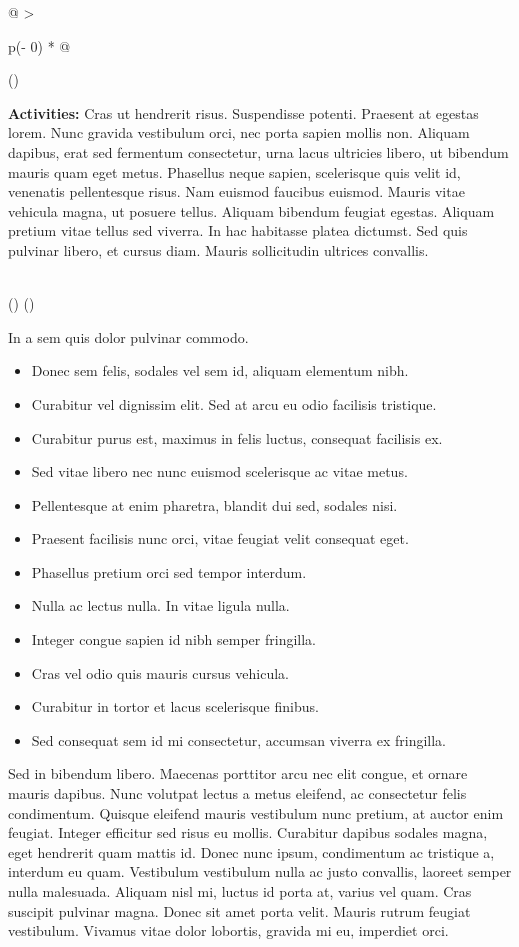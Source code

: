 \documentclass[
]{book}
\providecommand{\tightlist}{%
  \setlength{\itemsep}{0pt}\setlength{\parskip}{0pt}}
\begin{document}
\begin{longtable}[]{@{}
  >{\raggedright\arraybackslash}p{(\columnwidth - 0\tabcolsep) * }@{}}
\toprule()
\begin{minipage}[b]{\linewidth}\raggedright
\textbf{Activities:} Cras ut hendrerit risus. Suspendisse potenti. Praesent at egestas lorem. Nunc gravida vestibulum orci, nec porta sapien mollis non. Aliquam dapibus, erat sed fermentum consectetur, urna lacus ultricies libero, ut bibendum mauris quam eget metus. Phasellus neque sapien, scelerisque quis velit id, venenatis pellentesque risus. Nam euismod faucibus euismod. Mauris vitae vehicula magna, ut posuere tellus. Aliquam bibendum feugiat egestas. Aliquam pretium vitae tellus sed viverra. In hac habitasse platea dictumst. Sed quis pulvinar libero, et cursus diam. Mauris sollicitudin ultrices convallis.
\end{minipage} \\
\midrule()
\endhead
\bottomrule()
\end{longtable}

In a sem quis dolor pulvinar commodo.

\begin{itemize}
\tightlist
\item
  Donec sem felis, sodales vel sem id, aliquam elementum nibh.
\item
  Curabitur vel dignissim elit. Sed at arcu eu odio facilisis tristique.
\item
  Curabitur purus est, maximus in felis luctus, consequat facilisis ex.
\item
  Sed vitae libero nec nunc euismod scelerisque ac vitae metus.
\item
  Pellentesque at enim pharetra, blandit dui sed, sodales nisi.
\item
  Praesent facilisis nunc orci, vitae feugiat velit consequat eget.
\item
  Phasellus pretium orci sed tempor interdum.
\item
  Nulla ac lectus nulla. In vitae ligula nulla.
\item
  Integer congue sapien id nibh semper fringilla.
\item
  Cras vel odio quis mauris cursus vehicula.
\item
  Curabitur in tortor et lacus scelerisque finibus.
\item
  Sed consequat sem id mi consectetur, accumsan viverra ex fringilla.
\end{itemize}

Sed in bibendum libero. Maecenas porttitor arcu nec elit congue, et ornare mauris dapibus. Nunc volutpat lectus a metus eleifend, ac consectetur felis condimentum. Quisque eleifend mauris vestibulum nunc pretium, at auctor enim feugiat. Integer efficitur sed risus eu mollis. Curabitur dapibus sodales magna, eget hendrerit quam mattis id. Donec nunc ipsum, condimentum ac tristique a, interdum eu quam. Vestibulum vestibulum nulla ac justo convallis, laoreet semper nulla malesuada. Aliquam nisl mi, luctus id porta at, varius vel quam. Cras suscipit pulvinar magna. Donec sit amet porta velit. Mauris rutrum feugiat vestibulum. Vivamus vitae dolor lobortis, gravida mi eu, imperdiet orci.
\end{document}
